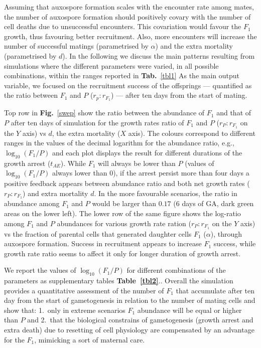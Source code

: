 \documentclass[a4paper,oneside]{article}
\begin{document}
    Assuming that auxospore formation scales with the encounter rate among mates, the number of auxospore formation should positively covary with the number of cell deaths due to unsuccessful encounters.
    This covariation would favour the $F_{1}$ growth, thus favouring better recruitment.
    Also, more encounters will increase the number of successful matings (parametrised by $\alpha$) and the extra mortality (parametrised by $d$). 
    In the following we discuss the main patterns resulting from simulations where the different parameters were varied, in all possible combinations, within the ranges reported in \textbf{Tab.}~\ref{tbl1}
    As the main output variable, we focused on the recruitment success of the offsprings --- quantified as the ratio between $F_{1}$ and $P$ ($r_p : r_{F_{1}}$) --- after ten days from the start of mating.

    Top row in \textbf{Fig.}~\ref{swep} show the ratio between the abundance of $F_{1}$ and that of $P$ after ten days of simulation for the growth rates ratio of $F_{1}$ and $P$ ($r_P : r_{F_{1}}$ on the $Y$ axis) vs $d$, the extra mortality ($X$ axis).
    The colours correspond to different ranges in the values of the decimal logarithm for the abundance ratio, e.g., $\log_{10}(F_{1}/P)$ and each plot displays the result for different durations of the growth arrest ($t_{AE}$).
    While $F_{1}$ will always be lower than $P$ (values of $\log_{10}(F_{1}/P)$ always lower than $0$), if the arrest persist more than four days a positive feedback appears between  abundance ratio and both net growth rates ($r_P : r_{F_{1}}$) and extra mortality $d$.
    In the more favourable scenarios, the ratio in abundance among $F_{1}$ and $P$ would be larger than $0.17$ (6 days of GA, dark green areas on the lower left).
    The lower row of the same figure shows the log-ratio among $F_{1}$ and $P$ abundances for various growth rate ration ($r_P : r_{F_{1}}$ on the $Y$ axis) vs the fraction of parental cells that generated daughter cells $F_{1}$ ($\alpha$), through auxospore formation.
    Success in recruitment appears to increase $F_{1}$ success, while growth rate ratio seems to affect it only for longer duration of growth arrest.

    We report the values of $\log_{10}(F_{1}/P)$ for different combinations of the parameters as supplementary tables \textbf{Table~\ref{tbl2}}..
    Overall the simulation provides a quantitative assessment of the number of $F_{1}$ that accumulate after ten day from the start of gametogenesis in relation to the number of mating cells and show that:
    1.\ only in extreme scenarios $F_{1}$ abundance will be equal or higher than $P$ and
    2.\ that the biological constrains of gametogenesis (growth arrest and extra death) due to resetting of cell physiology are compensated by an advantage for the $F_{1}$, mimicking a sort of maternal care.
\end{document}
